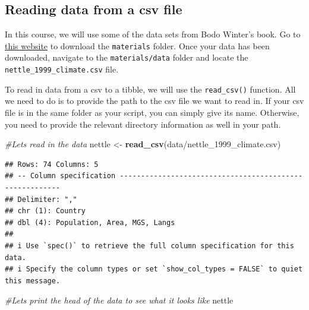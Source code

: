\documentclass[
]{book}
\newenvironment{Shaded}{\begin{snugshade}}{\end{snugshade}}
\newcommand{\CommentTok}[1]{\textcolor[rgb]{0.56,0.35,0.01}{\textit{#1}}}
\newcommand{\FunctionTok}[1]{\textcolor[rgb]{0.13,0.29,0.53}{\textbf{#1}}}
\newcommand{\NormalTok}[1]{#1}
\newcommand{\OtherTok}[1]{\textcolor[rgb]{0.56,0.35,0.01}{#1}}
\newcommand{\StringTok}[1]{\textcolor[rgb]{0.31,0.60,0.02}{#1}}
\begin{document}
\hypertarget{reading-data-from-a-csv-file}{%
\subsection{Reading data from a csv file}\label{reading-data-from-a-csv-file}}

In this course, we will use some of the data sets from Bodo Winter's book. Go to \href{https://osf.io/34mq9/}{this website} to download the \texttt{materials} folder. Once your data has been downloaded, navigate to the \texttt{materials/data} folder and locate the \texttt{nettle\_1999\_climate.csv} file.

To read in data from a csv to a tibble, we will use the \texttt{read\_csv()} function. All we need to do is to provide the path to the csv file we want to read in. If your csv file is in the same folder as your script, you can simply give its name. Otherwise, you need to provide the relevant directory information as well in your path.

\begin{Shaded}
\begin{Highlighting}[]
\CommentTok{\#Let\textquotesingle{}s read in the data}
\NormalTok{nettle }\OtherTok{\textless{}{-}} \FunctionTok{read\_csv}\NormalTok{(}\StringTok{\textquotesingle{}data/nettle\_1999\_climate.csv\textquotesingle{}}\NormalTok{)}
\end{Highlighting}
\end{Shaded}

\begin{verbatim}
## Rows: 74 Columns: 5
## -- Column specification --------------------------------------------------------
## Delimiter: ","
## chr (1): Country
## dbl (4): Population, Area, MGS, Langs
## 
## i Use `spec()` to retrieve the full column specification for this data.
## i Specify the column types or set `show_col_types = FALSE` to quiet this message.
\end{verbatim}

\begin{Shaded}
\begin{Highlighting}[]
\CommentTok{\#Let\textquotesingle{}s print the head of the data to see what it looks like}
\NormalTok{nettle}
\end{Highlighting}
\end{Shaded}
\end{document}
